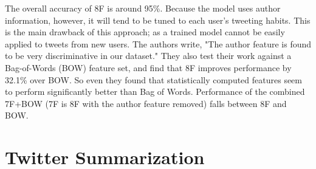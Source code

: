 The overall accuracy of 8F is around 95\%. Because the model uses author information, however, it will tend to be tuned to each user's tweeting habits. This is the main drawback of this approach; as a trained model cannot be easily applied to tweets from new users. The authors write, "The author feature is found to be very discriminative in our dataset." They also test their work against a Bag-of-Words (BOW) feature set, and find that 8F improves performance by 32.1\% over BOW. So even they found that statistically computed features seem to perform significantly better than Bag of Words. Performance of the combined 7F+BOW (7F is 8F with the author feature removed) falls between 8F and BOW. 

\section{Twitter Summarization}
